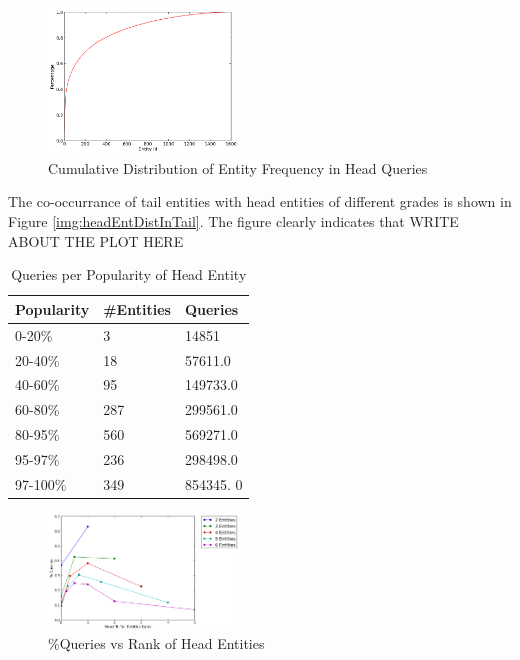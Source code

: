 \begin{figure}[t]
\label{img:headEntDist}
\caption{Cumulative Distribution of Entity Frequency in Head Queries}
  \centering
    \includegraphics[width = 0.45\textwidth]{images/entity-head-dist.png}
\end{figure}



The co-occurrance of tail entities with head entities of different grades is shown in 
Figure \ref{img:headEntDistInTail}. The figure clearly indicates that 
WRITE ABOUT THE PLOT HERE

 
\begin{table}
\caption{Queries per Popularity of Head Entity}
\label{table:headEntQueryDist}
\centering
\begin{tabular}{|l|l|l|}
\hline
Popularity & \#Entities & Queries \\ \hline
0-20\% & 3 & 14851 \\ \hline
20-40\% & 18  & 57611.0 \\ \hline
40-60\% & 95 & 149733.0 \\ \hline
60-80\% & 287 & 299561.0 \\ \hline
80-95\% & 560 & 569271.0 \\ \hline
95-97\% & 236 & 298498.0 \\ \hline
97-100\% & 349 & 854345. 0  \\ \hline
\end{tabular}
\end{table}


\begin{figure}[t]
\label{img:headRankInTail}
\caption{\%Queries vs Rank of Head Entities}
  \centering
    \includegraphics[width = 0.45\textwidth]{images/entity-head-query-ratio-dist.png}
\end{figure}





